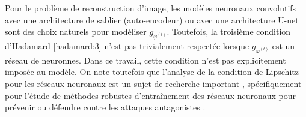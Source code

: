 Pour le problème de reconstruction d'image, les modèles neuronaux convolutifs avec une architecture de sablier (auto-encodeur) ou 
avec une architecture U-net \citep{Ronneberger2015} sont des choix naturels pour modéliser $g_{\varphi^{(t)}}$. 
Toutefois, la troisième condition d'Hadamard \ref{hadamard:3} n'est pas trivialement respectée lorsque $g_{\varphi^{(t)}}$ 
est un réseau de neuronnes. Dans ce travail, cette condition n'est pas explicitement imposée au modèle.  
On note toutefois que l'analyse de la condition de Lipschitz pour les réseaux neuronaux est un 
sujet de recherche important \citep[e.g.][]{Myiato2018,Scaman2018,Weng2018}, spécifiquement pour 
l'étude de méthodes robustes d'entraînement des réseaux neuronaux pour prévenir ou défendre contre 
les attaques antagonistes \citep{Szegedy2013,Goodfellow2014}. 

